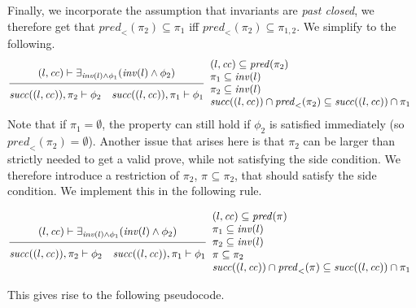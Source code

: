 \documentclass{article}
\newcommand{\proofrule}[3][]{#1 \frac{\raisebox{.7ex}{\normalsize{$#2$}}}
  {\raisebox{-1.0ex}{\normalsize{$#3$}}}}
\newcommand{\placeholder}[1][]{\pi_{#1}}
\newcommand{\loc}{l}
\newcommand{\region}{\mathit{cc}}
\newcommand{\suc}{\mathit{succ}}
\newcommand{\pre}{\mathit{pred}}
\newcommand{\inv}{\mathit{inv}}
\begin{document}
Finally, we incorporate the assumption that invariants are \emph{past closed}, we therefore get that $\pre_{<}(\placeholder[2]) \subseteq \placeholder[1]$ iff $\pre_{<}(\placeholder[2]) \subseteq \placeholder[1,2]$. We simplify to the following.
\[
\proofrule
{(\loc, \region) \vdash \exists_{\inv(\loc) \land \phi_1}(\inv(\loc) \land \phi_2)}
{\suc((\loc,\region)), \placeholder[2] \vdash \phi_2
\quad \suc((\loc, \region)), \placeholder[1] \vdash \phi_1
}
\begin{array}{l}
(\loc, \region) \subseteq \pre(\placeholder[2]) \\
\placeholder[1] \subseteq \inv(\loc) \\
\placeholder[2] \subseteq \inv(\loc) \\
\suc((\loc, \region)) \cap \pre_{<}(\placeholder[2]) \subseteq \suc((\loc, \region)) \cap \placeholder[1]
\end{array}
\]
Note that if $\placeholder[1] = \emptyset$, the property can still hold if $\phi_2$ is satisfied immediately (so $\pre_{<}(\placeholder[2]) = \emptyset$). Another issue that arises here is that $\placeholder[2]$ can be larger than strictly needed to get a valid prove, while not satisfying the side condition. We therefore introduce a restriction of $\placeholder[2]$, $\placeholder \subseteq \placeholder[2]$, that should satisfy the side condition. We implement this in the following rule.

\[
\proofrule
{(\loc, \region) \vdash \exists_{\inv(\loc) \land \phi_1}(\inv(\loc) \land \phi_2)}
{\suc((\loc,\region)), \placeholder[2] \vdash \phi_2
\quad \suc((\loc, \region)), \placeholder[1] \vdash \phi_1
}
\begin{array}{l}
(\loc, \region) \subseteq \pre(\placeholder) \\
\placeholder[1] \subseteq \inv(\loc) \\
\placeholder[2] \subseteq \inv(\loc) \\
\placeholder \subseteq \placeholder[2] \\
\suc((\loc, \region)) \cap \pre_{<}(\placeholder) \subseteq \suc((\loc, \region)) \cap \placeholder[1]
\end{array}
\]

This gives rise to the following pseudocode.
\end{document}
